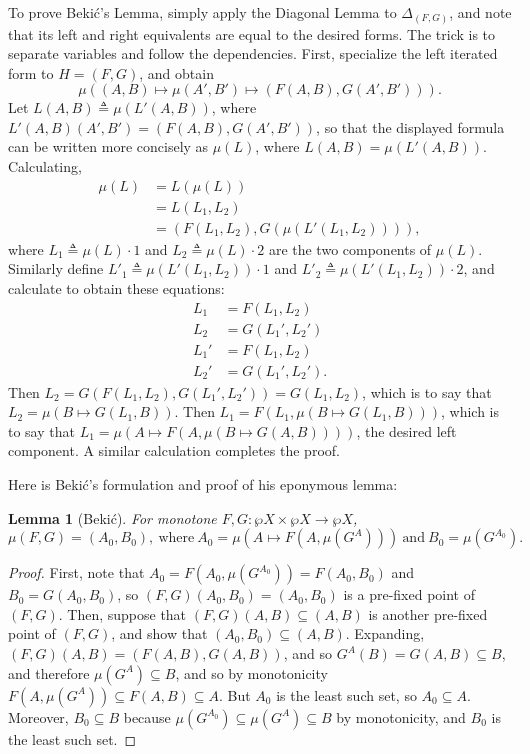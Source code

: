 \documentclass[11pt,twoside]{article}
\newcommand{\eqdef}{\mathrel{\triangleq}}
\begin{document}
To prove Beki\'{c}'s Lemma, simply apply the Diagonal Lemma to $\Delta_{(F,G)}$, and note that its
left and right equivalents are equal to the desired forms.  The trick is to separate
variables and follow the dependencies.  First, specialize the left iterated form to
$H=(F,G)$, and obtain
\begin{displaymath}
  \mu((A,B)\mapsto\mu(A',B')\mapsto(F(A,B),G(A',B'))).
\end{displaymath}
Let $L(A,B)\eqdef\mu(L'(A,B))$, where $L'(A,B)(A',B')=(F(A,B),G(A',B'))$, so that the
displayed formula can be written more concisely as $\mu(L)$, where $L(A,B)=\mu(L'(A,B))$.
Calculating,
\begin{align*}
  \mu(L)
  & = L(\mu(L)) \\
  & = L(L_{1},L_{2}) \\
  & = (F(L_{1},L_{2}),G(\mu(L'(L_{1},L_{2})))),
\end{align*}
where $L_{1}\eqdef \mu(L)\cdot 1$ and $L_{2}\eqdef \mu(L)\cdot 2$ are the two components of
$\mu(L)$.  Similarly define $L'_{1}\eqdef \mu(L'(L_{1},L_{2}))\cdot 1$ and
$L'_{2}\eqdef \mu(L'(L_{1},L_{2}))\cdot 2$, and calculate to obtain these equations:
\begin{align*}
  L_{1}   & = F(L_{1},L_{2}) \\
  L_{2}   & = G(L_{1}',L_{2}') \\
  L_{1}' & = F(L_{1}, L_{2}) \\
  L_{2}' & = G(L_{1}',L_{2}').
\end{align*}
Then $L_{2} = G(F(L_{1},L_{2}),G(L_{1}',L_{2}')) = G(L_{1},L_{2})$, which is to say that
$L_{2}=\mu(B\mapsto G(L_{1},B))$.  Then $L_{1} = F(L_{1}, \mu(B\mapsto G(L_{1},B)))$, which is to say that
$L_{1}=\mu(A\mapsto F(A,\mu(B\mapsto G(A,B))))$, the desired left component.  A similar calculation
completes the proof.

\bigskip

\newtheorem{lemma}{Lemma}

Here is Beki\'c's formulation and proof of his eponymous lemma:
\begin{lemma}[Beki\'c]  For monotone $F,G:\wp{X}\times\wp{X}\to\wp{X}$, 
  \begin{displaymath}
    \mu(F,G) = (A_{0},B_{0}),\ \text{where}\ A_{0}= \mu(A\mapsto F(A,\mu(G^{A})))\ \text{and}\ B_{0} = \mu(G^{A_{0}}).
  \end{displaymath}
\end{lemma}
\begin{proof}
  First, note that $A_{0}=F(A_{0},\mu(G^{A_{0}}))=F(A_0,B_{0})$ and
  $B_{0}=G(A_{0},B_{0})$, so $(F,G)(A_{0},B_{0})=(A_{0},B_{0})$ is a pre-fixed point of
  $(F,G)$.  Then, suppose that $(F,G)(A,B)\subseteq(A,B)$ is another pre-fixed point of
  $(F,G)$, and show that $(A_{0},B_{0})\subseteq(A,B)$.  Expanding,
  $(F,G)(A,B)=(F(A,B),G(A,B))$, and so $G^{A}(B)=G(A,B)\subseteq B$, and therefore
  $\mu(G^{A})\subseteq B$, and so by monotonicity
  $F(A,\mu(G^{A}))\subseteq F(A,B)\subseteq A$.  But $A_{0}$ is the least such set, so
  $A_{0}\subseteq A$.  Moreover, $B_{0}\subseteq B$ because
  $\mu(G^{A_{0}})\subseteq\mu(G^{A})\subseteq B$ by monotonicity, and $B_{0}$ is the least such set.
\end{proof}
\end{document}
